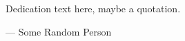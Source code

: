 \null
\vfill

\hfill \begin{minipage}{.75\textwidth}
Dedication text here, maybe a quotation.

\hfill --- Some Random Person 
\end{minipage}

\cleardoublepage
